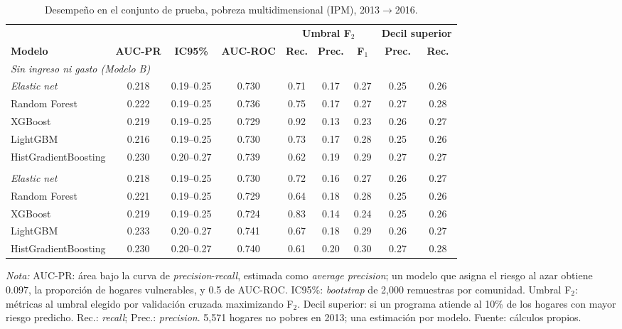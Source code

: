 \begin{table}[H]
  \centering
  \caption{Desempeño en el conjunto de prueba, pobreza multidimensional (IPM), 2013$\to$2016.}
  \label{tab:desempeno_pr_ipm}
  \footnotesize
  \setlength{\tabcolsep}{4pt}
  \begin{tabular}{l ccc ccc cc}
    \toprule
    & & & & \multicolumn{3}{c}{\textbf{Umbral F$_2$}} & \multicolumn{2}{c}{\textbf{Decil superior}} \\
    \cmidrule(lr){5-7}\cmidrule(lr){8-9}
    \textbf{Modelo} & \textbf{AUC-PR} & \textbf{IC95\%} & \textbf{AUC-ROC} & \textbf{Rec.} & \textbf{Prec.} & \textbf{F$_1$} & \textbf{Prec.} & \textbf{Rec.} \\
    \midrule
    \multicolumn{9}{l}{\textit{Sin ingreso ni gasto (Modelo B)}} \\
    \quad \emph{Elastic net} & 0.218 & 0.19--0.25 & 0.730 & 0.71 & 0.17 & 0.27 & 0.25 & 0.26 \\
    \quad Random Forest & 0.222 & 0.19--0.25 & 0.736 & 0.75 & 0.17 & 0.27 & 0.27 & 0.28 \\
    \quad XGBoost & 0.219 & 0.19--0.25 & 0.729 & 0.92 & 0.13 & 0.23 & 0.26 & 0.27 \\
    \quad LightGBM & 0.216 & 0.19--0.25 & 0.730 & 0.73 & 0.17 & 0.28 & 0.25 & 0.26 \\
    \quad HistGradientBoosting & 0.230 & 0.20--0.27 & 0.739 & 0.62 & 0.19 & 0.29 & 0.27 & 0.27 \\
    \addlinespace
    \multicolumn{9}{l}{\textit{Con ingreso y gasto (Modelo A)}} \\
    \quad \emph{Elastic net} & 0.218 & 0.19--0.25 & 0.730 & 0.72 & 0.16 & 0.27 & 0.26 & 0.27 \\
    \quad Random Forest & 0.221 & 0.19--0.25 & 0.729 & 0.64 & 0.18 & 0.28 & 0.25 & 0.26 \\
    \quad XGBoost & 0.219 & 0.19--0.25 & 0.724 & 0.83 & 0.14 & 0.24 & 0.25 & 0.26 \\
    \quad LightGBM & 0.233 & 0.20--0.27 & 0.741 & 0.67 & 0.18 & 0.29 & 0.26 & 0.27 \\
    \quad HistGradientBoosting & 0.230 & 0.20--0.27 & 0.740 & 0.61 & 0.20 & 0.30 & 0.27 & 0.28 \\
    \bottomrule
  \end{tabular}
  \begin{minipage}{0.95\textwidth}
    \vspace{4pt}
    \footnotesize \textit{Nota:} AUC-PR: área bajo la curva de
    \emph{precision}-\emph{recall}, estimada como \emph{average precision};
    un modelo que asigna el riesgo al azar obtiene 0.097, la
    proporción de hogares vulnerables, y 0.5 de AUC-ROC. IC95\%:
    \emph{bootstrap} de 2{,}000 remuestras por comunidad. Umbral F$_2$:
    métricas al umbral elegido por validación cruzada maximizando F$_2$.
    Decil superior: si un programa atiende al 10\% de los hogares con
    mayor riesgo predicho. Rec.: \emph{recall}; Prec.: \emph{precision}.
    5{,}571 hogares no pobres en 2013; una estimación por modelo.
    Fuente: cálculos propios.
  \end{minipage}
\end{table}